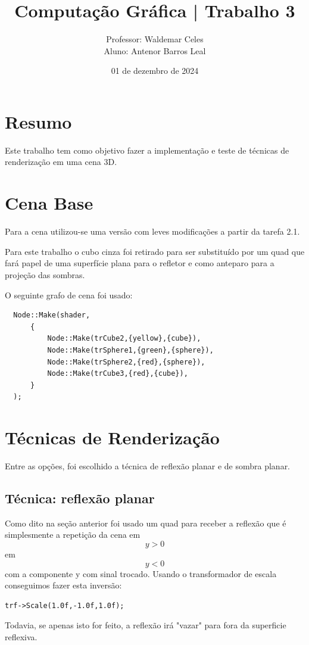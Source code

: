 \documentclass[11pt, a4paper]{article}
\title{Computação Gráfica | Trabalho 3}
\author{Professor: Waldemar Celes\\
Aluno: Antenor Barros Leal}
\date{01 de dezembro de 2024}
\begin{document}
\maketitle

\section {Resumo}
Este trabalho tem como objetivo fazer a implementação e teste de técnicas de renderização
em uma cena 3D.

\section {Cena Base}
Para a cena utilizou-se uma versão com leves modificações a partir da tarefa 2.1. 

Para este trabalho o cubo cinza foi retirado para ser substituído por um quad 
que fará papel de uma superfície plana para o refletor e como anteparo para a 
projeção das sombras.

O seguinte grafo de cena foi usado:

\begin{verbatim}
  Node::Make(shader,
      {
          Node::Make(trCube2,{yellow},{cube}),
          Node::Make(trSphere1,{green},{sphere}),
          Node::Make(trSphere2,{red},{sphere}),
          Node::Make(trCube3,{red},{cube}),
      }
  );
\end{verbatim}

\section {Técnicas de Renderização}

Entre as opções, foi escolhido a técnica de reflexão planar e de sombra planar.

\subsection {Técnica: reflexão planar}

Como dito na seção anterior foi usado um quad para receber a reflexão que é 
simplesmente a repetição da cena em $$y > 0$$ em $$y < 0$$ com a componente y
com sinal trocado. Usando o transformador de escala conseguimos fazer esta 
inversão:

\begin{verbatim}
trf->Scale(1.0f,-1.0f,1.0f);
\end{verbatim}

Todavia, se apenas isto for feito, a reflexão irá "vazar" para fora da superficie
reflexiva.
\end{document}
